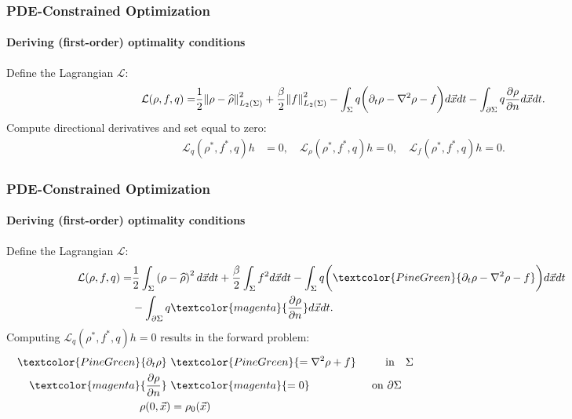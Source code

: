 \documentclass[aspectratio=169,xcolor=dvipsnames]{beamer}
\begin{document}
\begin{frame}
	\frametitle{PDE-Constrained Optimization}
		\framesubtitle{Deriving (first-order) optimality conditions}
	Define the Lagrangian $\mathcal{L}$:
	\begin{align*}
		\mathcal{L}(\rho, f,q)=& \frac{1}{2}\norm{\rho- \widehat{\rho}}_{L_2(\Sigma)}^2 + \frac{\beta}{2} \norm{f}_{L_2(\Sigma)}^2- \int_\Sigma q \bigg( \partial_t \rho - \nabla^2 \rho  - f \bigg) d\vec{x} dt - \int_{\partial \Sigma} q \frac{\partial \rho}{\partial n}   d\vec{x} dt.\\
	\end{align*}
	Compute directional derivatives and set equal to zero:
	\vspace{0.1cm}
	\begin{align*}
		\mathcal{L}_q (\rho^*, f^*,q) h&= 0, \quad
		\mathcal{L}_\rho (\rho^*, f^*,q) h= 0, \quad
		\mathcal{L}_f (\rho^*, f^*,q) h= 0.
	\end{align*}
\end{frame}
\begin{frame}
	\frametitle{PDE-Constrained Optimization}
	\framesubtitle{Deriving (first-order) optimality conditions}
	\vspace{0.2 cm}
	Define the Lagrangian $\mathcal{L}$:
	\begin{align*}
		\mathcal{L}(\rho, f,q)=& \frac{1}{2}\int_\Sigma \left(\rho- \widehat{\rho}\right)^2 d \vec x dt + \frac{\beta}{2} \int_\Sigma f^2 d \vec x dt - \int_\Sigma q \bigg(\textcolor{PineGreen}{ \partial_t \rho - \nabla^2 \rho  - f} \bigg) d\vec{x} dt \qquad \qquad\\
		&- \int_{\partial \Sigma} q \textcolor{magenta}{\frac{\partial \rho}{\partial n} }  d\vec{x} dt.
	\end{align*}
	Computing  $\mathcal{L}_q (\rho^*, f^*,q)h = 0$ results in the forward problem:
	\vspace{0.1cm}
	\begin{align*}
		\textcolor{PineGreen}{\partial_t \rho } \ & \textcolor{PineGreen}{ = \nabla^2 \rho + f} \ \qquad \text{  in    }\ \ \Sigma \phantom{vhfoijoihewrbgjkngmcojrpf      hfhioewjgpfinioer nnf}\\
		\textcolor{magenta}{\frac{\partial \rho}{\partial n}} \ & \textcolor{magenta}{ = 0} \quad \ \ \qquad \qquad \text{on   } \partial \Sigma   \\
		\rho(0,\vec{x}) &= \rho_0(\vec{x})
	\end{align*}
\end{frame}
\end{document}
